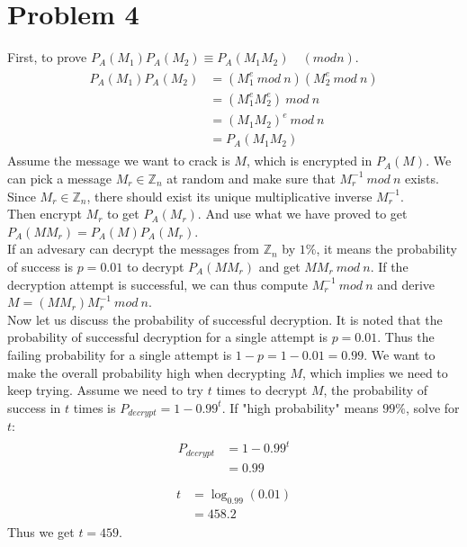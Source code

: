 \documentclass[titlepage, paper=a4, fontsize=11pt]{scrartcl} %
\numberwithin{equation}{section} %
\numberwithin{figure}{section} %
\numberwithin{table}{section} %
\begin{document}

\section*{Problem 4}
First, to prove $P_A(M_1)P_A(M_2) \equiv P_A(M_1M_2) \quad (mod n)$.
\begin{align*} 
\begin{split}
P_A(M_1)P_A(M_2) &= (M_1^e \  mod \ n )(M_2^e \  mod \ n ) \\
&= (M_1^eM_2^e) \ mod \ n \\
&= (M_1M_2)^e \ mod \ n \\
&= P_A(M_1M_2)
\end{split}					
\end{align*}
Assume the message we want to crack is $M$, which is encrypted in $P_A(M)$.
We can pick a message $M_r \in \mathbb{Z}_n$ at random and make sure that $M_{r}^{-1} \ mod \ n$ exists.
Since $M_r \in \mathbb{Z}_n$, there should exist its unique multiplicative inverse $M_r^{-1}$. \\

Then encrypt $M_r$ to get $P_A(M_r)$. And use what we have proved to get
$P_A(MM_r) = P_A(M)P_A(M_r)$. \\

If an advesary can decrypt the messages from $\mathbb{Z}_n$ by $1\%$, it means the probability of success
is $p = 0.01$ to decrypt $P_A(MM_r)$ and get $MM_r \ mod \ n$. If the decryption attempt is successful,
we can thus compute $M_r^{-1} \ mod \ n$ and derive $M = (MM_r)M_r^{-1} \ mod \ n$. \\

Now let us discuss the probability of successful decryption. It is noted that the probability of successful decryption
for a single attempt is $p = 0.01$. Thus the failing probability for a single attempt is $1-p = 1- 0.01 = 0.99$.
We want to make the overall probability high when decrypting $M$, which implies we need to keep trying.
Assume we need to try $t$ times to decrypt $M$, the probability of success in $t$ times is
$P_{decrypt} = 1-0.99^t$. If "high probability" means $99\%$, solve for $t$:
\begin{align*} 
\begin{split}
P_{decrypt} &= 1 - 0.99^t \\
&= 0.99 \\
\end{split}					
\end{align*}
\begin{align*} 
\begin{split}
t &= \log_{0.99}(0.01) \\
&= 458.2
\end{split}					
\end{align*}
Thus we get $t = 459$.
\\
\end{document}
